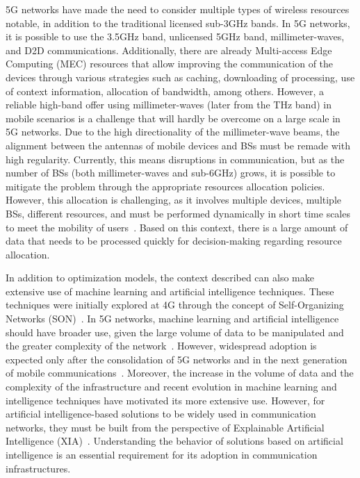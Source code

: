 5G networks have made the need to consider multiple types of wireless resources notable, in addition to the traditional licensed sub-3GHz bands. In 5G networks, it is possible to use the 3.5GHz band, unlicensed 5GHz band, millimeter-waves, and D2D communications. Additionally, there are already Multi-access Edge Computing (MEC) resources that allow improving the communication of the devices through various strategies such as caching, downloading of processing, use of context information, allocation of bandwidth, among others. However, a reliable high-band offer using millimeter-waves (later from the THz band) in mobile scenarios is a challenge that will hardly be overcome on a large scale in 5G networks. Due to the high directionality of the millimeter-wave beams, the alignment between the antennas of mobile devices and BSs must be remade with high regularity. Currently, this means disruptions in communication, but as the number of BSs (both millimeter-waves and sub-6GHz) grows, it is possible to mitigate the problem through the appropriate resources allocation policies. However, this allocation is challenging, as it involves multiple devices, multiple BSs, different resources, and must be performed dynamically in short time scales to meet the mobility of users~\cite{semiari:19}. Based on this context, there is a large amount of data that needs to be processed quickly for decision-making regarding resource allocation.

In addition to optimization models, the context described can also make extensive use of machine learning and artificial intelligence techniques. These techniques were initially explored at 4G through the concept of Self-Organizing Networks (SON)~\cite{peng:13}. In 5G networks, machine learning and artificial intelligence should have broader use, given the large volume of data to be manipulated and the greater complexity of the network~\cite{saad:19}. However, widespread adoption is expected only after the consolidation of 5G networks and in the next generation of mobile communications~\cite{letaief:19}. Moreover, the increase in the volume of data and the complexity of the infrastructure and recent evolution in machine learning and intelligence techniques have motivated its more extensive use. However, for artificial intelligence-based solutions to be widely used in communication networks, they must be built from the perspective of Explainable Artificial Intelligence (XIA)~\cite{adadi:18}. Understanding the behavior of solutions based on artificial intelligence is an essential requirement for its adoption in communication infrastructures.

